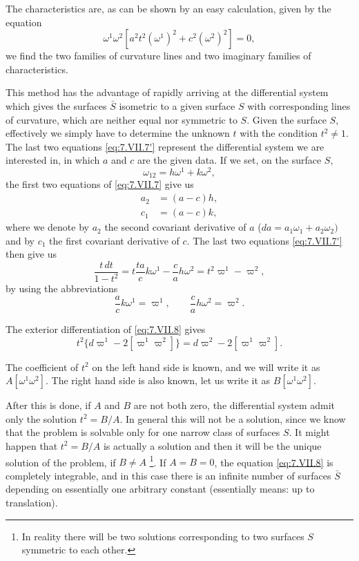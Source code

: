 \documentclass[leqno,11pt]{book}
\numberwithin{equation}{chapter}
\theoremstyle{shape1}
\theoremstyle{shape0}
\theoremstyle{shape2}
\theoremstyle{definition}
\begin{document}
The characteristics are, as can be shown by an easy calculation, given by the equation
\[
\omega^{1}\omega^{2}[a^{2}t^{2}(\omega^{1})^{2}+c^{2}(\omega^{2})^{2}]=0,
\]
we find the two families of curvature lines and two imaginary families of characteristics.

\vspace{12pt}\fsec This method has the advantage of rapidly arriving at the differential system which gives the surfaces $\bar S$ isometric to a given surface $S$ with corresponding lines of curvature, which are neither equal nor symmetric to $S$. Given the surface $S$, effectively we simply have to determine the unknown $t$ with the condition $t^{2}\neq 1$. The last two equations \eqref{eq:7.VII.7'} represent the differential system we are interested in, in which $a$ and $c$ are the given data. If we set, on the surface $S$,
\[
\omega_{12}=h\omega^{1}+k\omega^{2},
\]
the first two equations of \eqref{eq:7.VII.7} give us
\begin{align*}
  a_{2}&=(a-c)h,\\
  c_{1}&=(a-c)k,
\end{align*}
where we denote by $a_{2}$ the second covariant derivative of $a$ ($da=a_{1}\omega_{1}+a_{2}\omega_{2})$ and by $c_{1}$ the first covariant derivative of $c$. The last two equations \eqref{eq:7.VII.7'} then give us
\begin{equation}
  \label{eq:7.VII.8}\tag{VII, 8}
  \frac{t\,dt}{1-t^{2}}=t\frac{ta}{c}k\omega^{1}-\frac{c}{a}h\omega^{2}=t^{2}\varpi^{1}-\varpi^{2},
\end{equation}
by using the abbreviations
\[
\frac{a}{c}k\omega^{1}=\varpi^{1},\qquad\frac{c}{a}h\omega^{2}=\varpi^{2}.
\]

The exterior differentiation of \eqref{eq:7.VII.8} gives
\[
t^{2}\{d\varpi^{1}-2[\varpi^{1}\varpi^{2}]\}=d\varpi^{2}-2[\varpi^{1}\varpi^{2}].
\]

The coefficient of $t^{2}$ on the left hand side is known, and we will write it as $A[\omega^{1}\omega^{2}]$. The right hand side is also known, let us write it as $B[\omega^{1}\omega^{2}]$.

After this is done, if $A$ and $B$ are not both zero, the differential system admit only the solution $t^{2}=B/A$. In general this will not be a solution, since we know that the problem is solvable only for one narrow class of surfaces $S$. It might happen that $t^{2}=B/A$ is actually a solution and then it will be the unique solution of the problem, if  $B\neq A$ \footnote{In reality there will be two solutions corresponding to two surfaces $S$ symmetric to each other.}. If $A=B=0$, the equation \eqref{eq:7.VII.8} is completely integrable, and in this case there is an infinite number of surfaces $\bar S$ depending on essentially one arbitrary constant (essentially means: up to translation).
\end{document}
